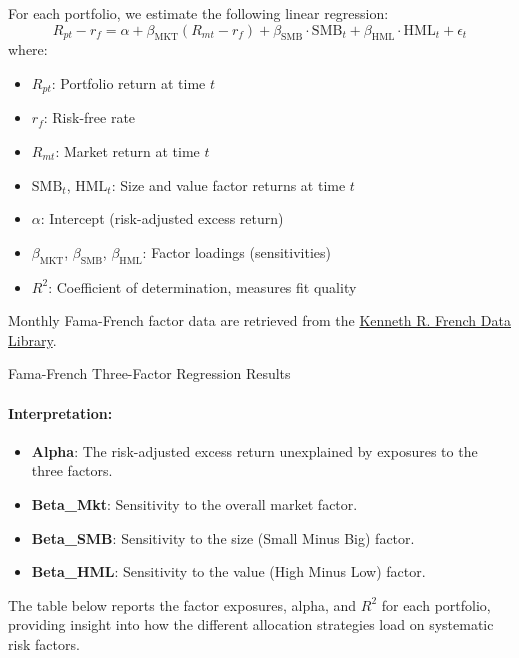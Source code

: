 \documentclass{article}
\begin{document}
For each portfolio, we estimate the following linear regression:
\[
R_{pt} - r_f = \alpha + \beta_{\mathrm{MKT}} (R_{mt} - r_f) + \beta_{\mathrm{SMB}} \cdot \mathrm{SMB}_t + \beta_{\mathrm{HML}} \cdot \mathrm{HML}_t + \epsilon_t
\]
where:
\begin{itemize}
    \item $R_{pt}$: Portfolio return at time $t$
    \item $r_f$: Risk-free rate
    \item $R_{mt}$: Market return at time $t$
    \item $\mathrm{SMB}_t$, $\mathrm{HML}_t$: Size and value factor returns at time $t$
    \item $\alpha$: Intercept (risk-adjusted excess return)
    \item $\beta_{\mathrm{MKT}}$, $\beta_{\mathrm{SMB}}$, $\beta_{\mathrm{HML}}$: Factor loadings (sensitivities)
    \item $R^2$: Coefficient of determination, measures fit quality
\end{itemize}


Monthly Fama-French factor data are retrieved from the \href{https://mba.tuck.dartmouth.edu/pages/faculty/ken.french/data_library.html}{Kenneth R. French Data Library}.


\begin{table}[htbp]
\centering
\caption{Fama-French Three-Factor Regression Results}
\label{tab:stats_capm}
\begin{adjustbox}{max width=\textwidth}
    
\end{adjustbox}
\end{table}

\paragraph{Interpretation:}
\begin{itemize}
    \item \textbf{Alpha}: The risk-adjusted excess return unexplained by exposures to the three factors.
    \item \textbf{Beta\_Mkt}: Sensitivity to the overall market factor.
    \item \textbf{Beta\_SMB}: Sensitivity to the size (Small Minus Big) factor.
    \item \textbf{Beta\_HML}: Sensitivity to the value (High Minus Low) factor.
\end{itemize}


The table below reports the factor exposures, alpha, and $R^2$ for each portfolio, providing insight into how the different allocation strategies load on systematic risk factors.
\clearpage
\end{document}
